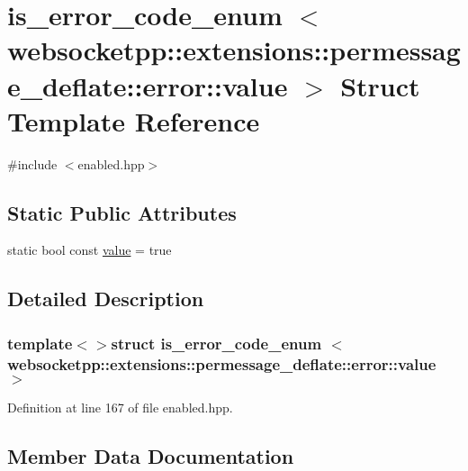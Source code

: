 \hypertarget{structis__error__code__enum_01_01_01_01_3_01websocketpp_1_1extensions_1_1permessage__deflate_1_1error_1_1value_01_4}{}\section{is\+\_\+error\+\_\+code\+\_\+enum $<$ websocketpp\+:\+:extensions\+:\+:permessage\+\_\+deflate\+:\+:error\+:\+:value $>$ Struct Template Reference}
\label{structis__error__code__enum_01_01_01_01_3_01websocketpp_1_1extensions_1_1permessage__deflate_1_1error_1_1value_01_4}


{\ttfamily \#include $<$enabled.\+hpp$>$}

\subsection*{Static Public Attributes}
\begin{DoxyCompactItemize}
\item 
static bool const \hyperlink{structis__error__code__enum_01_01_01_01_3_01websocketpp_1_1extensions_1_1permessage__deflate_1_1error_1_1value_01_4_a40d6a9879d46788c2400b2152c808580}{value} = true
\end{DoxyCompactItemize}


\subsection{Detailed Description}
\subsubsection*{template$<$$>$struct is\+\_\+error\+\_\+code\+\_\+enum    $<$ websocketpp\+::extensions\+::permessage\+\_\+deflate\+::error\+::value $>$}



Definition at line 167 of file enabled.\+hpp.



\subsection{Member Data Documentation}
\hypertarget{structis__error__code__enum_01_01_01_01_3_01websocketpp_1_1extensions_1_1permessage__deflate_1_1error_1_1value_01_4_a40d6a9879d46788c2400b2152c808580}{}
